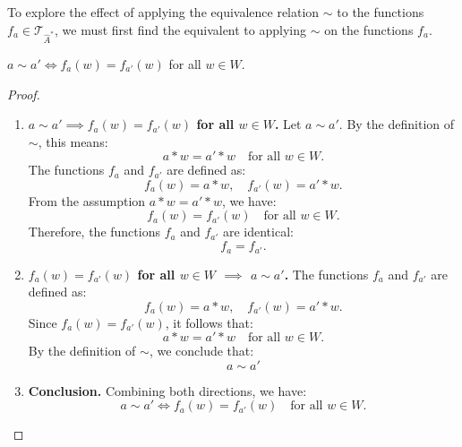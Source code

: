 To explore the effect of applying the equivalence relation $\sim$ to the functions $f_{a} \in \mathcal{T}_{\hat{A}^{\ast}}$, we must first find the equivalent to applying $\sim$ on the functions $f_{a}$.

\begin{proposition}\label{prp:equivalence_equivalence_on_functions}
    $a \sim a' \iff f_{a}(w) = f_{a'}(w)$ for all $w \in W$.
\end{proposition}
\begin{proof}
\begin{enumerate}[(1)]
    \item \textbf{$a \sim a' \implies f_{a}(w) = f_{a'}(w)$ for all $w \in W$.}
    Let $a \sim a'$. By the definition of $\sim$, this means:
    \begin{equation}
    a \ast w = a' \ast w \quad \text{for all } w \in W.
    \end{equation}
    The functions $f_{a}$ and $f_{a'}$ are defined as:
    \begin{equation}
    f_{a}(w) = a \ast w, \quad f_{a'}(w) = a' \ast w.
    \end{equation}
    From the assumption $a \ast w = a' \ast w$, we have:
    \begin{equation}
    f_{a}(w) = f_{a'}(w) \quad \text{for all } w \in W.
    \end{equation}
    Therefore, the functions $f_{a}$ and $f_{a'}$ are identical:
    \begin{equation}
    f_{a} = f_{a'}.
    \end{equation}

    \item \textbf{$f_{a}(w) = f_{a'}(w)$ for all $w \in W$ $\implies$ $a \sim a'$.}
    The functions $f_{a}$ and $f_{a'}$ are defined as:
    \begin{equation}
    f_{a}(w) = a \ast w, \quad f_{a'}(w) = a' \ast w.
    \end{equation}
    Since $f_{a}(w) = f_{a'}(w)$, it follows that:
    \begin{equation}
    a \ast w = a' \ast w \quad \text{for all } w \in W.
    \end{equation}
    By the definition of $\sim$, we conclude that:
    \begin{equation}
    a \sim a'
    \end{equation}

    \item \textbf{Conclusion.}
    Combining both directions, we have:
    \begin{equation}
        a \sim a' \iff f_{a}(w) = f_{a'}(w) \quad \text{for all } w \in W.
    \end{equation}
\end{enumerate}
\end{proof}

